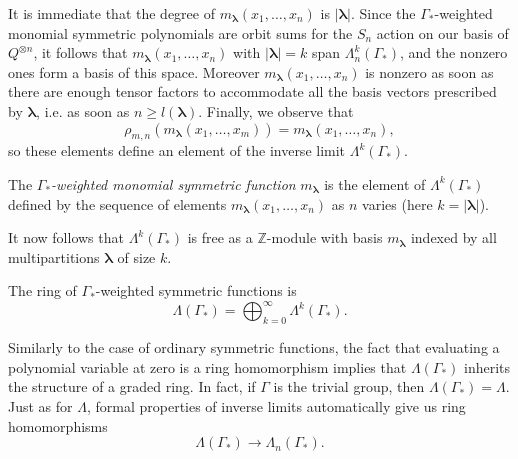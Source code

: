 \documentclass[ALCO,Unicode]{cedram}
\newcommand{\bs}{\boldsymbol}
\newcommand{\LambdaG}{\Lambda(\Gamma_*)}
\newcommand{\LambdaG}{\Lambda(\Gamma_*)}
\begin{document}
It is immediate that the degree of $m_{\bs\lambda}(x_1, \ldots, x_n)$ is $|\bs\lambda|$. Since the $\Gamma_*$-weighted monomial symmetric polynomials are orbit sums for the $S_n$ action on our basis of $Q^{\otimes n}$, it follows that $m_{\bs\lambda}(x_1, \ldots, x_n)$ with $|\bs\lambda|=k$ span $\Lambda_{n}^k(\Gamma_*)$, and the nonzero ones form a basis of this space. Moreover $m_{\bs\lambda}(x_1, \ldots, x_n)$ is nonzero as soon as there are enough tensor factors to accommodate all the basis vectors prescribed by $\bs \lambda$, i.e. as soon as $n \geq l(\bs\lambda)$. Finally, we observe that
\[
\rho_{m,n}(m_{\bs\lambda}(x_1,\ldots, x_m)) = m_{\bs\lambda}(x_1,\ldots, x_n),
\]
so these elements define an element of the inverse limit $\Lambda^k(\Gamma_*)$.
\begin{definition}
The \emph{$\Gamma_*$-weighted monomial symmetric function} $m_{\bs\lambda}$ is the element of $\Lambda^k(\Gamma_*)$ defined by the sequence of elements $m_{\bs\lambda}(x_1, \dots, x_n)$ as $n$ varies \textup{(}here $k = |\bs\lambda|$\textup{)}.
\end{definition}

It now follows that $\Lambda^k(\Gamma_*)$ is free as a $\mathbb{Z}$-module with basis $m_{\bs\lambda}$ indexed by all multipartitions $\bs\lambda$ of size $k$.
\begin{definition}
The ring of $\Gamma_*$-weighted symmetric functions is
\[
\LambdaG = \bigoplus_{k=0}^{\infty} \Lambda^k(\Gamma_*).
\]
\end{definition}

Similarly to the case of ordinary symmetric functions, the fact that evaluating a polynomial variable at zero is a ring homomorphism implies that $\LambdaG$ inherits the structure of a graded ring. In fact, if $\Gamma$ is the trivial group, then $\LambdaG = \Lambda$. Just as for $\Lambda$, formal properties of inverse limits automatically give us ring homomorphisms
\[
\LambdaG \to \Lambda_n(\Gamma_*).
\]
\end{document}
